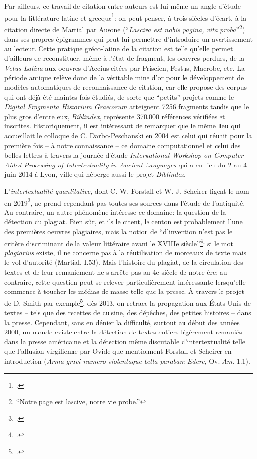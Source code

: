 Par ailleurs, ce travail de citation entre auteurs est lui-même un angle d'étude pour la littérature latine et grecque\footcite{darbo-peschanski_citation_2004}: on peut penser, à trois siècles d'écart, à la citation directe de Martial par Ausone (\enquote{\textit{Lasciva est nobis pagina, vita proba}}\footnote{\enquote{Notre page est lascive, notre vie probe.}}) dans ses propres épigrammes qui peut lui permettre d'introduire un avertissement au lecteur. Cette pratique gréco-latine de la citation est telle qu'elle permet d'ailleurs de reconstituer, même à l'état de fragment, les oeuvres perdues, de la \textit{Vetus Latina} aux oeuvres d'Accius citées par Priscien, Festus, Macrobe, etc. La période antique relève donc de la véritable mine d'or pour le développement de modèles automatiques de reconnaissance de citation, car elle propose des corpus qui ont déjà été maintes fois étudiés, de sorte que \enquote{petits} projets comme le \textit{Digital Fragmenta Historium Graecorum} atteignent 7256 fragments tandis que le plus gros d'entre eux, \textit{Biblindex}, représente 370.000 références vérifiées et inscrites. Historiquement, il est intéressant de remarquer que le même lieu qui accueillait le colloque de C.  Darbo-Peschanski en 2004 est celui qui réunit pour la première fois -- à notre connaissance -- ce domaine computationnel et celui des belles lettres à travers la journée d'étude \textit{International Workshop on Computer Aided Processing of Intertextuality in Ancient Languages} qui a eu lieu du 2 au 4 juin 2014 à Lyon, ville qui héberge aussi le projet \textit{Biblindex}.

L'\textit{intertextualité quantitative}, dont C. W. Forstall et W. J. Scheirer figent le nom en 2019\footcite{forstall_quantitative_2019}, ne prend cependant pas toutes ses sources dans l'étude de l'antiquité. Au contraire, un autre phénomène intéresse ce domaine: la question de la détection du plagiat. Bien sûr, et ils le citent, le centon est probablement l'une des premières oeuvres plagiaires, mais la notion de \enquote{d'invention n'est pas le critère discriminant de la valeur littéraire avant le XVIIIe siècle}\footcite{aron_plagiat_2010}: si le mot \textit{plagiarius} existe, il ne concerne pas à la réutilisation de morceaux de texte mais le vol d'autorité (Martial, I.53). Mais l'histoire du plagiat, de la circulation des textes et de leur remaniement ne s'arrête pas au 4e siècle de notre ère: au contraire, cette question peut se relever particulièrement intéressante lorsqu'elle commence à toucher les médias de masse telle que la presse. À travers le projet de D. Smith par exemple\footcite{smith_computational_2015, smith_infectious_2013}, dès 2013, on retrace la propagation aux États-Unis de textes -- tels que des recettes de cuisine, des dépêches, des petites histoires -- dans la presse. Cependant, sans en dénier la difficulté, surtout au début des années 2000, un monde existe entre la détection de textes entiers légèrement remaniés dans la presse américaine et la détection même discutable d'intertextualité telle que l'allusion virgilienne par Ovide que mentionnent Forstall et Scheirer en introduction (\textit{Arma gravi numero violentaque bella parabam Edere}, Ov. \textit{Am}. 1.1). 

